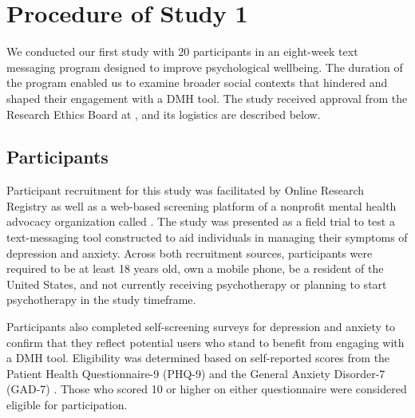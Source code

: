 \section{Procedure of Study 1}
We conducted our first study with 20 participants in an eight-week text messaging program designed to improve psychological wellbeing. The duration of the program enabled us to examine broader social contexts that hindered and shaped their engagement with a DMH tool. The study received approval from the Research Ethics Board at , and its logistics are described below.

\subsection{Participants}

Participant recruitment for this study was facilitated by  Online Research Registry as well as a web-based screening platform of a nonprofit mental health advocacy organization called . %
The study was presented as a field trial to test a text-messaging tool constructed to aid individuals in managing their symptoms of depression and anxiety. Across both recruitment sources, participants were required to be at least 18 years old, own a mobile phone, be a resident of the United States, and not currently receiving psychotherapy or planning to start psychotherapy in the study timeframe. 

Participants also completed self-screening surveys for depression and anxiety to confirm that they reflect potential users who stand to benefit from engaging with a DMH tool. Eligibility was determined based on self-reported scores from the Patient Health Questionnaire-9 (PHQ-9) \cite{kroenke2001phq} and the General Anxiety Disorder-7 (GAD-7) \cite{williams2014gad}. Those who scored 10 or higher on either questionnaire were considered eligible for participation.



